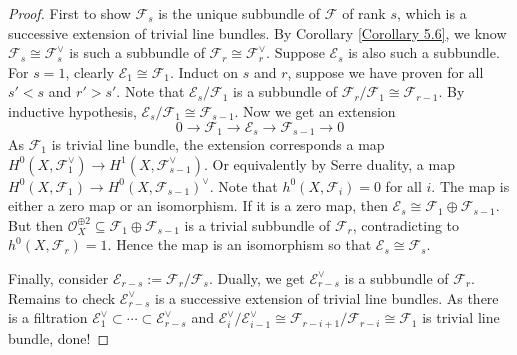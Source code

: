 \documentclass{ctexart}
\begin{document}
\begin{proof}
    First to show $\mathcal{F}_{s}$ is the unique subbundle of $\mathcal{F}$ of rank $s$, which is a successive extension of trivial line bundles.
    By Corollary \ref{Corollary 5.6}, we know $\mathcal{F}_{s} \cong \mathcal{F}_{s}^{\vee}$ is such a subbundle of $\mathcal{F}_{r} \cong \mathcal{F}_{r}^{\vee}$.
    Suppose $\mathcal{E}_{s}$ is also such a subbundle.
    For $s = 1$, clearly $\mathcal{E}_{1} \cong \mathcal{F}_{1}$.
    Induct on $s$ and $r$, suppose we have proven for all $s' < s$ and $r' > s'$.
    Note that $\mathcal{E}_{s}/\mathcal{F}_{1}$ is a subbundle of $\mathcal{F}_{r}/\mathcal{F}_{1} \cong \mathcal{F}_{r - 1}$.
    By inductive hypothesis, $\mathcal{E}_{s}/\mathcal{F}_{1} \cong \mathcal{F}_{s - 1}$.
    Now we get an extension 
    \begin{equation}
        0 \longrightarrow \mathcal{F}_{1} \longrightarrow \mathcal{E}_{s} \longrightarrow \mathcal{F}_{s - 1} \longrightarrow 0
    \end{equation}
    As $\mathcal{F}_{1}$ is trivial line bundle, the extension corresponds a map $H^{0}(X, \mathcal{F}_{1}^{\vee}) \rightarrow H^{1}(X, \mathcal{F}_{s - 1}^{\vee})$.
    Or equivalently by Serre duality, a map $H^{0}(X, \mathcal{F}_{1}) \rightarrow H^{0}(X, \mathcal{F}_{s - 1})^{\vee}$.
    Note that $h^{0}(X, \mathcal{F}_{i}) = 0$ for all $i$.
    The map is either a zero map or an isomorphism.
    If it is a zero map, then $\mathcal{E}_{s} \cong \mathcal{F}_{1} \oplus \mathcal{F}_{s - 1}$.
    But then $\mathcal{O}_{X}^{\oplus 2} \subseteq \mathcal{F}_{1} \oplus \mathcal{F}_{s - 1}$ is a trivial subbundle of $\mathcal{F}_{r}$, contradicting to $h^{0}(X, \mathcal{F}_{r}) = 1$.
    Hence the map is an isomorphism so that $\mathcal{E}_{s} \cong \mathcal{F}_{s}$.
    \par
    Finally, consider $\mathcal{E}_{r - s} := \mathcal{F}_{r}/\mathcal{F}_{s}$.
    Dually, we get $\mathcal{E}_{r - s}^{\vee}$ is a subbundle of $\mathcal{F}_{r}$.
    Remains to check $\mathcal{E}_{r - s}^{\vee}$ is a successive extension of trivial line bundles.
    As there is a filtration $\mathcal{E}_{1}^{\vee} \subset \cdots \subset \mathcal{E}_{r - s}^{\vee}$ and $\mathcal{E}_{i}^{\vee}/\mathcal{E}_{i - 1}^{\vee} \cong \mathcal{F}_{r - i + 1}/\mathcal{F}_{r - i} \cong \mathcal{F}_{1}$ is trivial line bundle, done!
\end{proof}
\end{document}
